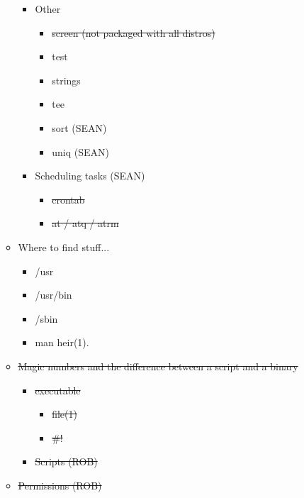 \documentclass[12pt]{article}
\begin{document}
\begin{itemize}
\begin{itemize}
\begin{itemize}
			\item Other 
			\begin{itemize}
				\item \sout {screen (not packaged with all distros)}
				\item test 
				\item strings 
				\item tee 
				\item sort (SEAN)
				\item uniq (SEAN)
			\end{itemize}
			\item Scheduling tasks  (SEAN)
			\begin{itemize}
				\item \sout{crontab}
				\item \sout{at / atq / atrm }
			\end{itemize}
		\end {itemize} 
		\item Where to find stuff... 
		\begin{itemize}
			\item /usr 
			\item /usr/bin 
			\item /sbin 
			\item man heir(1). 
		\end{itemize}
		\item \sout {Magic numbers and the difference between a script and a binary} 
		\begin{itemize}
			\item \sout {executable}
			\begin{itemize}
				\item \sout {file(1)} 
				\item \sout {\#!} 
			\end{itemize}
			\item \sout {Scripts  (ROB)}
		\end{itemize}
		\item \sout {Permissions (ROB)}
		

\end{itemize}
\end{itemize}
\end{document}
